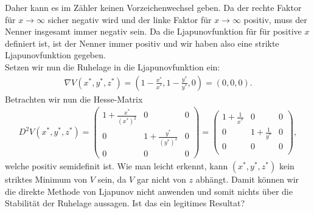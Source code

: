 \begin{solution}
Daher kann es im Zähler keinen Vorzeichenwechsel geben. Da der rechte Faktor für $x \to \infty$ sicher negativ wird
und der linke Faktor für $x \to \infty$ positiv, muss der Nenner insgesamt immer negativ sein.
Da die Ljapunovfunktion für für positive $x$ definiert ist, ist der Nenner immer positiv
und wir haben also eine strikte Ljapunovfunktion gegeben. \\
Setzen wir nun die Ruhelage in die Ljapunovfunktion ein:
\begin{align*}
  \nabla V(x^*,y^*,z^*) = (1 - \frac{x^*}{x^*}, 1 - \frac{y^*}{y^*}, 0) = (0,0,0).
\end{align*}
Betrachten wir nun die Hesse-Matrix
\begin{align*}
  D^2 V(x^*,y^*,z^*) = \begin{pmatrix}
    1 + \frac{x^*}{(x^*)^2} & 0 & 0 \\
    0 & 1 + \frac{y^*}{(y^*)^2} & 0 \\
    0 & 0 & 0
  \end{pmatrix}
  = \begin{pmatrix}
    1 + \frac{1}{x^*} & 0 & 0\\
    0 & 1 + \frac{1}{y^*} & 0 \\
    0 & 0 & 0 \\
  \end{pmatrix},
\end{align*}
welche positiv semidefinit ist. Wie man leicht erkennt, kann $(x^*,y^*,z^*)$ kein
striktes Minimum von $V$ sein, da $V$ gar nicht von $z$ abhängt. Damit können wir
die direkte Methode von Ljapunov nicht anwenden und somit nichts über die Stabilität
der Ruhelage aussagen. Ist das ein legitimes Resultat?
\end{solution}
